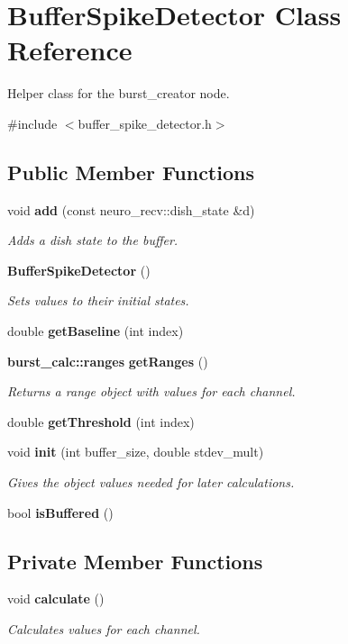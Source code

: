 \section{\-Buffer\-Spike\-Detector \-Class \-Reference}
\label{classBufferSpikeDetector}


\-Helper class for the burst\-\_\-creator node.  




{\ttfamily \#include $<$buffer\-\_\-spike\-\_\-detector.\-h$>$}

\subsection*{\-Public \-Member \-Functions}
\begin{DoxyCompactItemize}
\item 
void {\bf add} (const neuro\-\_\-recv\-::dish\-\_\-state \&d)
\begin{DoxyCompactList}\small\item\em \-Adds a dish state to the buffer. \end{DoxyCompactList}\item 
{\bf \-Buffer\-Spike\-Detector} ()
\begin{DoxyCompactList}\small\item\em \-Sets values to their initial states. \end{DoxyCompactList}\item 
double {\bf get\-Baseline} (int index)
\item 
{\bf burst\-\_\-calc\-::ranges} {\bf get\-Ranges} ()
\begin{DoxyCompactList}\small\item\em \-Returns a range object with values for each channel. \end{DoxyCompactList}\item 
double {\bf get\-Threshold} (int index)
\item 
void {\bf init} (int buffer\-\_\-size, double stdev\-\_\-mult)
\begin{DoxyCompactList}\small\item\em \-Gives the object values needed for later calculations. \end{DoxyCompactList}\item 
bool {\bf is\-Buffered} ()
\end{DoxyCompactItemize}
\subsection*{\-Private \-Member \-Functions}
\begin{DoxyCompactItemize}
\item 
void {\bf calculate} ()
\begin{DoxyCompactList}\small\item\em \-Calculates values for each channel. \end{DoxyCompactList}\end{DoxyCompactItemize}
